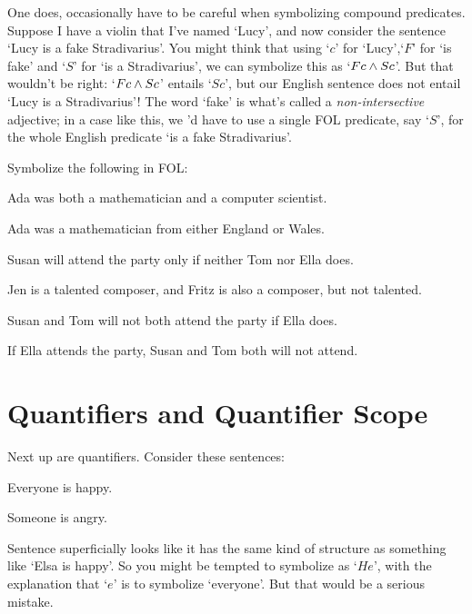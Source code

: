 One does, occasionally  have to be careful when symbolizing compound predicates.  Suppose I have a violin that I've named `Lucy', and now consider the sentence `Lucy is a fake Stradivarius'.  You might think that using `$c$' for `Lucy',`$F$' for `\blank is fake' and `$S$' for `\blank is a Stradivarius', we can symbolize this as `$Fc \wedge Sc$'.  But that wouldn't be right: `$Fc \wedge Sc$' entails `$Sc$', but our English sentence does not entail `Lucy is a Stradivarius'!  The word `fake' is what's called a \emph{non-intersective} adjective; in a case like this, we 'd have to use a single FOL predicate, say `$S$', for the  whole English predicate `\blank is a fake Stradivarius'.


\practiceproblems

\problempart Symbolize the following in FOL:



\begin{earg}
\item Ada was both a mathematician and a computer scientist.
\item Ada was a mathematician from either England or Wales.
\item Susan will attend the party only if neither Tom nor Ella does.
\item Jen is a talented composer, and Fritz is also a composer, but not talented.
\item Susan and Tom will not both attend the party if Ella does. 
\item If Ella attends the party, Susan and Tom both will not attend. 

\end{earg}


\section{Quantifiers and Quantifier Scope}\label{s:Quantifiers}
Next up are quantifiers. Consider these sentences:
	\begin{earg}
		\item[\ex{q.a}] Everyone is happy.
		\item[\ex{q.e}] Someone is angry.
	\end{earg}
Sentence  superficially looks like it has the same kind of structure as something like `Elsa is happy'.  So you might be tempted to symbolize  as `$He$', with the explanation that `$e$' is to symbolize `everyone'.  But that would be a serious mistake.

